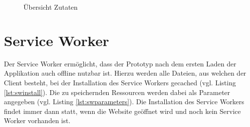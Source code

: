 \documentclass[a4paper, 12pt]{scrreprt}
\begin{document}
\begin{figure}[H]
\begin{minipage}{.45\textwidth}
		\caption{Übersicht Zutaten}
		\label{fig:uiIngredientsSmall}
	\end{minipage}
\end{figure}

\section{Service Worker}

Der Service Worker ermöglicht, dass der Prototyp nach dem ersten Laden der Applikation auch offline nutzbar ist. Hierzu werden alle Dateien, aus welchen der Client besteht, bei der Installation des Service Workers gecached (vgl. Listing \ref{lst:swinstall}). Die zu speichernden Ressourcen werden dabei als Parameter angegeben (vgl. Listing \ref{lst:swparameters}). Die Installation des Service Workers findet immer dann statt, wenn die Website geöffnet wird und noch kein Service Worker vorhanden ist.
\end{document}
